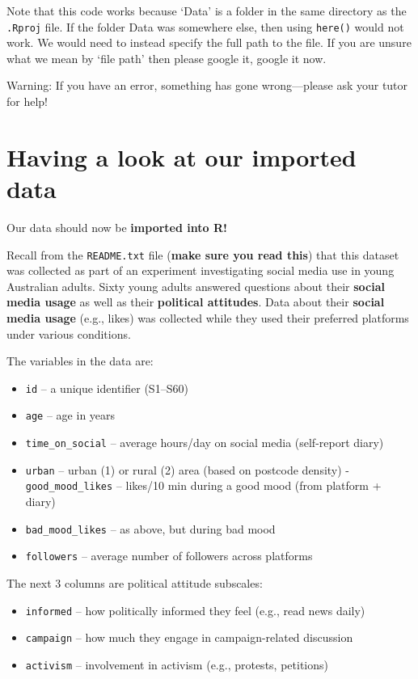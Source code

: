 \documentclass[
]{book}
\providecommand{\tightlist}{%
  \setlength{\itemsep}{0pt}\setlength{\parskip}{0pt}}
\begin{document}
Note that this code works because `Data' is a folder in the same directory as the \texttt{.Rproj} file. If the folder Data was somewhere else, then using \texttt{here()} would not work. We would need to instead specify the full path to the file. If you are unsure what we mean by `file path' then please google it, google it now.

Warning: If you have an error, something has gone wrong---please ask your tutor for help!

\section{Having a look at our imported data}\label{having-a-look-at-our-imported-data}

Our data should now be \textbf{imported into R!}

Recall from the \texttt{README.txt} file (\textbf{make sure you read this}) that this dataset was collected as part of an experiment investigating social media use in young Australian adults. Sixty young adults answered questions about their \textbf{social media usage} as well as their \textbf{political attitudes}. Data about their \textbf{social media usage} (e.g., likes) was collected while they used their preferred platforms under various conditions.

The variables in the data are:

\begin{itemize}
\tightlist
\item
  \texttt{id} -- a unique identifier (S1--S60)
\item
  \texttt{age} -- age in years
\item
  \texttt{time\_on\_social} -- average hours/day on social media (self-report diary)
\item
  \texttt{urban} -- urban (1) or rural (2) area (based on postcode density)
  -\texttt{good\_mood\_likes} -- likes/10 min during a good mood (from platform + diary)
\item
  \texttt{bad\_mood\_likes} -- as above, but during bad mood
\item
  \texttt{followers} -- average number of followers across platforms
\end{itemize}

The next 3 columns are political attitude subscales:

\begin{itemize}
\tightlist
\item
  \texttt{informed} -- how politically informed they feel (e.g., read news daily)
\item
  \texttt{campaign} -- how much they engage in campaign-related discussion
\item
  \texttt{activism} -- involvement in activism (e.g., protests, petitions)
\end{itemize}
\end{document}
